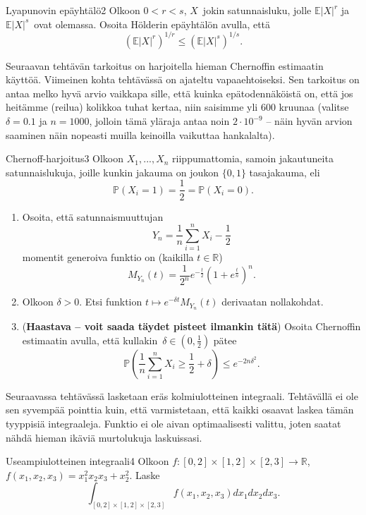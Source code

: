 \documentclass[11pt,a4paper]{amsart}
\newcommand{\R}{\mathbb{R}}
\newcommand{\E}{\mathbb{E}}
\newcommand{\1}{\mathbf{1}}
\renewcommand{\P}{\mathbb P}
\begin{document}
\begin{Exercises}{Lyapunovin epäyhtälö}{2}
Olkoon $0<r<s$, $X$ jokin satunnaisluku, jolle $\E |X|^r$ ja $\E |X|^s$ ovat olemassa. Osoita Hölderin epäyhtälön avulla, että 
\[
\left(\E |X|^r\right)^{1/r}\leq \left(\E |X|^{s}\right)^{1/s}.
\]

\end{Exercises}

Seuraavan tehtävän tarkoitus on harjoitella hieman Chernoffin estimaatin käyttöä. Viimeinen kohta tehtävässä on ajateltu vapaaehtoiseksi. Sen tarkoitus on antaa melko hyvä arvio vaikkapa sille, että kuinka epätodennäköistä on, että jos heitämme (reilua) kolikkoa tuhat kertaa, niin saisimme yli 600 kruunaa (valitse $\delta=0.1$ ja $n=1000$, jolloin tämä yläraja antaa noin $2\cdot 10^{-9}$ -- näin hyvän arvion saaminen näin nopeasti muilla keinoilla vaikuttaa hankalalta). 

\begin{Exercises}{Chernoff-harjoitus}{3}
Olkoon $X_1,...,X_n$ riippumattomia, samoin jakautuneita satunnaislukuja, joille kunkin jakauma on joukon $\{0,1\}$ tasajakauma, eli 
\[
\P(X_i=1)=\frac{1}{2}=\P(X_i=0).
\] 
\begin{enumerate}
\item Osoita, että satunnaismuuttujan 
\[
Y_n=\frac{1}{n}\sum_{i=1}^n X_i-\frac{1}{2}
\]
momentit generoiva funktio on (kaikilla $t\in \R$)
\[
M_{Y_n}(t)=\frac{1}{2^n}e^{-\frac{t}{2}}(1+e^{\frac{t}{n}})^n.
\]

\item Olkoon $\delta>0$. Etsi funktion $t\mapsto e^{-\delta t}M_{Y_n}(t)$ derivaatan nollakohdat.


\item ({\bf Haastava -- voit saada täydet pisteet ilmankin tätä}) Osoita Chernoffin estimaatin avulla, että kullakin $\delta\in(0,\frac{1}{2})$ pätee 
\[
\P\left(\frac{1}{n}\sum_{i=1}^n X_i\geq \frac{1}{2}+\delta\right)\leq e^{-2n\delta^2}.
\]

\end{enumerate}
\end{Exercises}

Seuraavassa tehtävässä lasketaan eräs kolmiulotteinen integraali. Tehtävällä ei ole sen syvempää pointtia kuin, että varmistetaan, että kaikki osaavat laskea tämän tyyppisiä integraaleja. Funktio ei ole aivan optimaalisesti valittu, joten saatat nähdä hieman ikäviä murtolukuja laskuissasi.


\begin{Exercises}{Useampiulotteinen integraali}{4}
Olkoon $f:[0,2]\times[1,2]\times[2,3]\to \R$, $f(x_1,x_2,x_3)=x_1^2x_2x_3+x_2^2$. Laske 
\[
\int_{[0,2]\times[1,2]\times[2,3]}f(x_1,x_2,x_3)dx_1dx_2dx_3.
\]

\end{Exercises}
\end{document}
